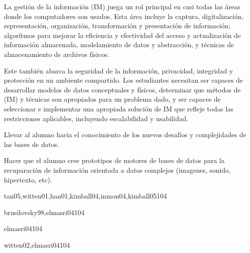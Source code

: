 \begin{syllabus}


\begin{justification}
La gestión de la información (IM) juega un rol principal en casi todas las áreas donde los computadores son usados. Esta área incluye la captura, digitalización, representación, organización, transformación y presentación de información; algorítmos para mejorar la eficiencia y efectividad del acceso y actualización de información almacenada, modelamiento de datos y abstracción, y técnicas de almacenamiento de archivos físicos.

Este también abarca la seguridad de la información, privacidad, integridad y protección en un ambiente compartido. Los estudiantes necesitan ser capaces de desarrollar modelos de datos conceptuales y físicos, determinar que métodos de (IM) y técnicas son apropiados para un problema dado, y ser capaces de seleccionar e implementar una apropiada solución de IM que refleje todas las restricciones aplicables, incluyendo escalabilidad y usabilidad.
\end{justification}

\begin{goals}
\item Llevar al alumno hacia el conocimiento de los nuevos desafíos y complejidades de las bases de datos.
\item Hacer que el alumno cree prototipos de motores de bases de datos para la recuparación de información orientada a datos complejos (imagenes, sonido, hipertexto, etc).
\end{goals}

\begin{outcomes}
\end{outcomes}

\begin{unit}{\IMDataMiningDef}{tan05,witten01,han01,kimball04,inmon04,kimball05}{10}{4}
    \IMDataMiningAllTopics%
    \IMDataMiningAllObjectives%
\end{unit}

\begin{unit}{\IMHypermidiaDef}{brusilovsky98,elmasri04}{10}{4}
    \IMHypermidiaAllTopics%
    \IMHypermidiaAllObjectives%
\end{unit}

\begin{unit}{\IMMultimediaSystemsDef}{elmasri04}{10}{4}
    \IMMultimediaSystemsAllTopics%
    \IMMultimediaSystemsAllObjectives%
\end{unit}

\begin{unit}{\IMDigitalLibrariesDef}{witten02,elmasri04}{10}{4}
    \IMDigitalLibrariesAllTopics%
    \IMDigitalLibrariesAllObjectives%
\end{unit}



\begin{coursebibliography}
\end{coursebibliography}

\end{syllabus}
